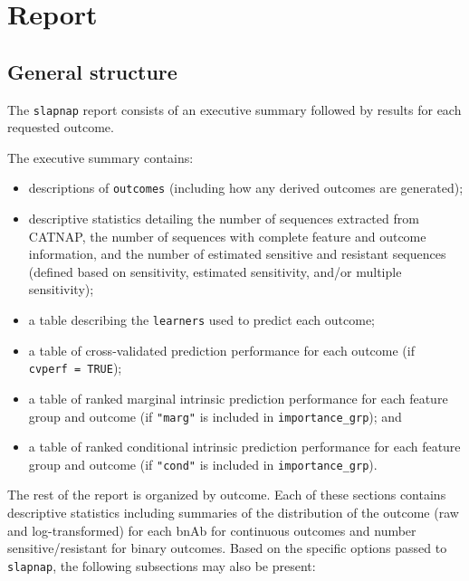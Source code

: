 \documentclass[
]{article}
\providecommand{\tightlist}{%
  \setlength{\itemsep}{0pt}\setlength{\parskip}{0pt}}
\begin{document}
\hypertarget{sec:report}{%
\section{Report}\label{sec:report}}

\hypertarget{general-structure}{%
\subsection{General structure}\label{general-structure}}

The \texttt{slapnap} report consists of an executive summary followed by results for each requested outcome.

The executive summary contains:

\begin{itemize}
\tightlist
\item
  descriptions of \texttt{outcomes} (including how any derived outcomes are generated);
\item
  descriptive statistics detailing the number of sequences extracted from CATNAP, the number of sequences with complete feature and outcome information, and the number of estimated sensitive and resistant sequences (defined based on sensitivity, estimated sensitivity, and/or multiple sensitivity);
\item
  a table describing the \texttt{learners} used to predict each outcome;
\item
  a table of cross-validated prediction performance for each outcome (if \texttt{cvperf\ =\ TRUE});
\item
  a table of ranked marginal intrinsic prediction performance for each feature group and outcome (if \texttt{"marg"} is included in \texttt{importance\_grp}); and
\item
  a table of ranked conditional intrinsic prediction performance for each feature group and outcome (if \texttt{"cond"} is included in \texttt{importance\_grp}).
\end{itemize}

The rest of the report is organized by outcome. Each of these sections contains descriptive statistics including summaries of the distribution of the outcome (raw and log-transformed) for each bnAb for continuous outcomes and number sensitive/resistant for binary outcomes. Based on the specific options passed to \texttt{slapnap}, the following subsections may also be present:
\end{document}
